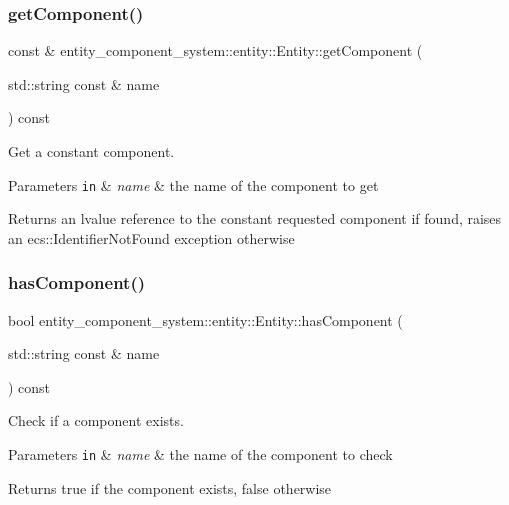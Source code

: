 \subsubsection{get\+Component()\hspace{0.1cm}{\footnotesize\ttfamily [2/2]}}
{\footnotesize{} const  \& entity\+\_\+component\+\_\+system\+::entity\+::\+Entity\+::get\+Component (\begin{DoxyParamCaption}\item[{std\+::string const \&}]{name }\end{DoxyParamCaption}) const}



Get a constant component. 


\begin{DoxyParams}[1]{Parameters}
\mbox{\tt in}  & {\em name} & the name of the component to get \\
\hline
\end{DoxyParams}
\begin{DoxyReturn}{Returns}
an lvalue reference to the constant requested component if found, raises an ecs\+::\+Identifier\+Not\+Found exception otherwise 
\end{DoxyReturn}
\label{classentity__component__system_1_1entity_1_1_entity_abc71d22109dd5ba9b6c6825299404cc0} 
\subsubsection{has\+Component()}
{\footnotesize\ttfamily bool entity\+\_\+component\+\_\+system\+::entity\+::\+Entity\+::has\+Component (\begin{DoxyParamCaption}\item[{std\+::string const \&}]{name }\end{DoxyParamCaption}) const}



Check if a component exists. 


\begin{DoxyParams}[1]{Parameters}
\mbox{\tt in}  & {\em name} & the name of the component to check \\
\hline
\end{DoxyParams}
\begin{DoxyReturn}{Returns}
true if the component exists, false otherwise 
\end{DoxyReturn}
\label{classentity__component__system_1_1entity_1_1_entity_a2888352392f840e1a438d048c5408c26} 
